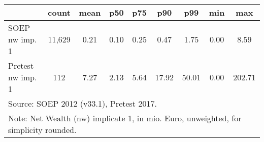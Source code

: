 {
\def\sym#1{\ifmmode^{#1}\else\(^{#1}\)\fi}
\begin{tabular}{l*{1}{cccccccc}}
\hline\hline
                                            &       count&        mean&         p50&         p75&         p90&         p99&         min&         max\\
\hline
SOEP nw imp. 1                              &      11,629&        0.21&        0.10&        0.25&        0.47&        1.75&        0.00&        8.59\\
Pretest nw imp. 1                           &         112&        7.27&        2.13&        5.64&       17.92&       50.01&        0.00&      202.71\\
\hline\hline
\multicolumn{9}{l}{\footnotesize Source: SOEP 2012 (v33.1), Pretest 2017.}\\
\multicolumn{9}{l}{\footnotesize Note: Net Wealth (nw) implicate 1, in mio. Euro, unweighted, for simplicity rounded.}\\
\end{tabular}
}

